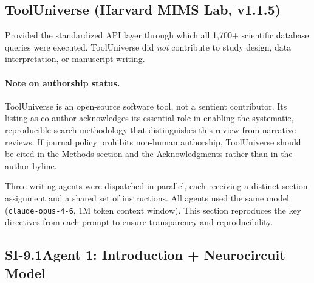 \subsection*{ToolUniverse (Harvard MIMS Lab, v1.1.5)}

Provided the standardized API layer through which all 1,700+ scientific
database queries were executed.  ToolUniverse did \emph{not} contribute to
study design, data interpretation, or manuscript writing.

\paragraph{Note on authorship status.}
ToolUniverse is an open-source software tool, not a sentient contributor.  Its
listing as co-author acknowledges its essential role in enabling the
systematic, reproducible search methodology that distinguishes this review
from narrative reviews.  If journal policy prohibits non-human authorship,
ToolUniverse should be cited in the Methods section and the Acknowledgments
rather than in the author byline.


Three writing agents were dispatched in parallel, each receiving a distinct
section assignment and a shared set of instructions.  All agents used the same
model (\texttt{claude-opus-4-6}, 1M token context window).  This section
reproduces the key directives from each prompt to ensure transparency and
reproducibility.

\subsection*{SI-9.1\quad Agent 1: Introduction + Neurocircuit Model}

